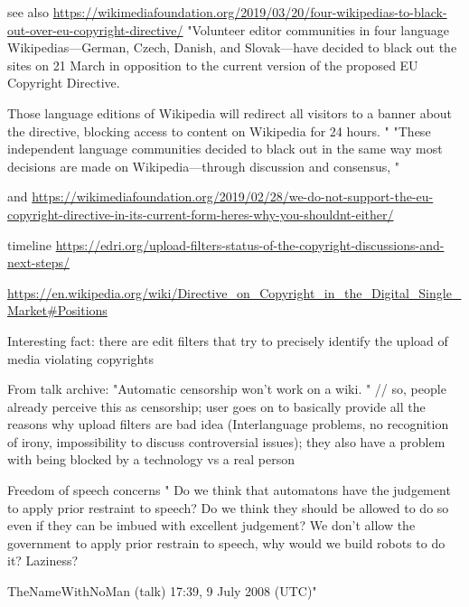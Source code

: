 see also
\url{https://wikimediafoundation.org/2019/03/20/four-wikipedias-to-black-out-over-eu-copyright-directive/}
"Volunteer editor communities in four language Wikipedias—German, Czech, Danish, and Slovak—have decided to black out the sites on 21 March in opposition to the current version of the proposed EU Copyright Directive.

Those language editions of Wikipedia will redirect all visitors to a banner about the directive, blocking access to content on Wikipedia for 24 hours. "
"These independent language communities decided to black out in the same way most decisions are made on Wikipedia—through discussion and consensus, "

and
\url{https://wikimediafoundation.org/2019/02/28/we-do-not-support-the-eu-copyright-directive-in-its-current-form-heres-why-you-shouldnt-either/}

timeline
\url{https://edri.org/upload-filters-status-of-the-copyright-discussions-and-next-steps/}

\url{https://en.wikipedia.org/wiki/Directive_on_Copyright_in_the_Digital_Single_Market#Positions}

Interesting fact: there are edit filters that try to precisely identify the upload of media violating copyrights


From talk archive:
"Automatic censorship won't work on a wiki. " // so, people already perceive this as censorship; user goes on to basically provide all the reasons why upload filters are bad idea (Interlanguage problems, no recognition of irony, impossibility to discuss controversial issues); they also have a problem with being blocked by a technology vs a real person

Freedom of speech concerns
" Do we think that automatons have the judgement to apply prior restraint to speech? Do we think they should be allowed to do so even if they can be imbued with excellent judgement? We don't allow the government to apply prior restrain to speech, why would we build robots to do it? Laziness?

TheNameWithNoMan (talk) 17:39, 9 July 2008 (UTC)"


